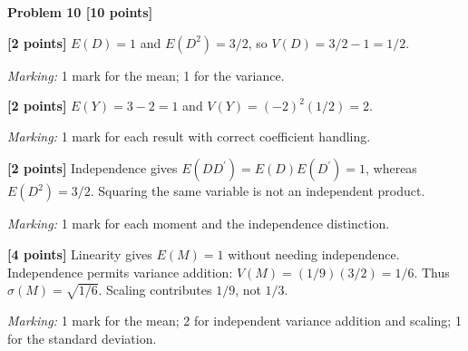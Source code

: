 \documentclass[12pt,letterpaper]{article}
\newcommand{\problemheading}[2][5\baselineskip]{\Needspace{#1}\par\noindent\hspace*{-0.625in}\textbf{#2}\par\nobreak\vspace{0.3em}}
\begin{document}
\vspace{0.65em}
\problemheading[\dimexpr 3\baselineskip+4\baselineskip\relax]{Problem 10 [10 points]}
\begin{description}[font=\normalfont,leftmargin=1.2em,labelsep=0.4em]
\item[(a)] \textbf{[2 points]} $E(D)=1$ and $E(D^2)=3/2$, so $V(D)=3/2-1=1/2$.
\par\textit{Marking:} 1 mark for the mean; 1 for the variance.
\item[(b)] \textbf{[2 points]} $E(Y)=3-2=1$ and $V(Y)=(-2)^2(1/2)=2$.
\par\textit{Marking:} 1 mark for each result with correct coefficient handling.
\item[(c)] \textbf{[2 points]} Independence gives $E(DD^{\prime})=E(D)E(D^{\prime})=1$, whereas $E(D^2)=3/2$. Squaring the same variable is not an independent product.
\par\textit{Marking:} 1 mark for each moment and the independence distinction.
\item[(d)] \textbf{[4 points]} Linearity gives $E(M)=1$ without needing independence. Independence permits variance addition: $V(M)=(1/9)(3/2)=1/6$. Thus $\sigma(M)=\sqrt{1/6}$. Scaling contributes $1/9$, not $1/3$.
\par\textit{Marking:} 1 mark for the mean; 2 for independent variance addition and scaling; 1 for the standard deviation.
\end{description}
\end{document}

